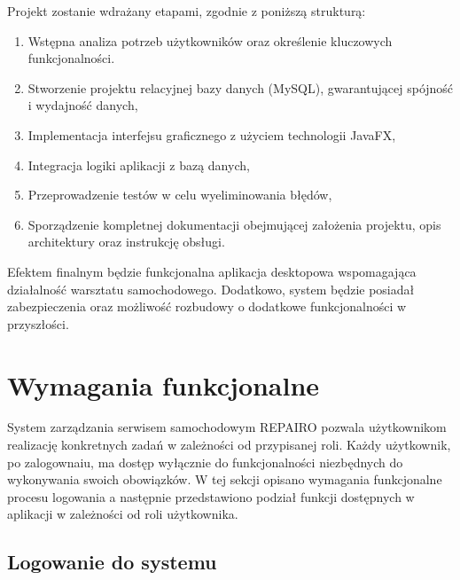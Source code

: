 Projekt zostanie wdrażany etapami, zgodnie z poniższą strukturą:
\begin{enumerate}
    \item Wstępna analiza potrzeb użytkowników oraz określenie kluczowych funkcjonalności.
    \item Stworzenie projektu relacyjnej bazy danych (MySQL), gwarantującej spójność i wydajność danych,
    \item Implementacja interfejsu graficznego z użyciem technologii JavaFX,
    \item Integracja logiki aplikacji z bazą danych,
    \item Przeprowadzenie testów w celu wyeliminowania błędów,
    \item Sporządzenie kompletnej dokumentacji obejmującej założenia projektu, opis architektury oraz instrukcję obsługi.
\end{enumerate}

Efektem finalnym będzie funkcjonalna aplikacja desktopowa wspomagająca działalność warsztatu samochodowego. Dodatkowo, system będzie posiadał zabezpieczenia oraz możliwość rozbudowy o dodatkowe funkcjonalności w przyszłości.


\section{Wymagania funkcjonalne}
\label{sec:wymaganiaFunkcjonalne}
System zarządzania serwisem samochodowym REPAIRO pozwala użytkownikom realizację konkretnych zadań w zależności od przypisanej roli. Każdy użytkownik, po zalogownaiu, ma dostęp wyłącznie do funkcjonalności niezbędnych do wykonywania swoich obowiązków. W tej sekcji opisano wymagania funkcjonalne procesu logowania a następnie przedstawiono podział funkcji dostępnych w aplikacji w zależności od roli użytkownika.

\subsection{Logowanie do systemu}
\label{sec:logowanie}

